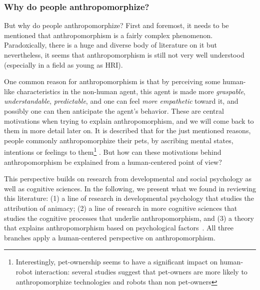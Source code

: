 \documentclass{frontiersSCNS} %
\begin{document}


\subsubsection{Why do people anthropomorphize?\\}
\label{sec:explanations}

But why do people anthropomorphize? First and foremost, it needs to be mentioned that anthropomorphism is a fairly complex phenomenon. Paradoxically, there is a huge and diverse body of literature on it but nevertheless, it seems that anthropomorphism is still not very well understood (especially in a field as young as HRI).

One common reason for anthropomorphism is that by perceiving some human-like characteristics in the non-human agent, this agent is made more \emph{graspable}, \emph{understandable}, \emph{predictable}, and one can feel \emph{more empathetic} toward it, and possibly one can then anticipate the agent's behavior. These are central motivations when trying to explain anthropomorphism, and we will come back to them in more detail later on. 
It is described that for the just mentioned reasons, people commonly anthropomorphize their pets, by ascribing mental states, intentions or feelings to them\footnote{Interestingly, pet-ownership seems to have a significant impact on human-robot interaction: several studies suggest that pet-owners are more likely to anthropomorphize technologies and robots than non pet-owners} \cite{eddy_attribution_1993}. But how can these motivations behind anthropomorphism be explained from a human-centered point of view?



This perspective builds on research from developmental and social psychology as well as cognitive sciences.  In the following, we present what we found in reviewing this literature: (1) a line of research in developmental psychology that studies the attribution of animacy; (2) a line of research in more cognitive sciences that studies the cognitive processes that underlie anthropomorphism, and (3) a theory that explains anthropomorphism based on psychological factors~\citep{epley_seeing_2007}. All three branches apply a human-centered perspective on anthropomorphism.
\end{document}
